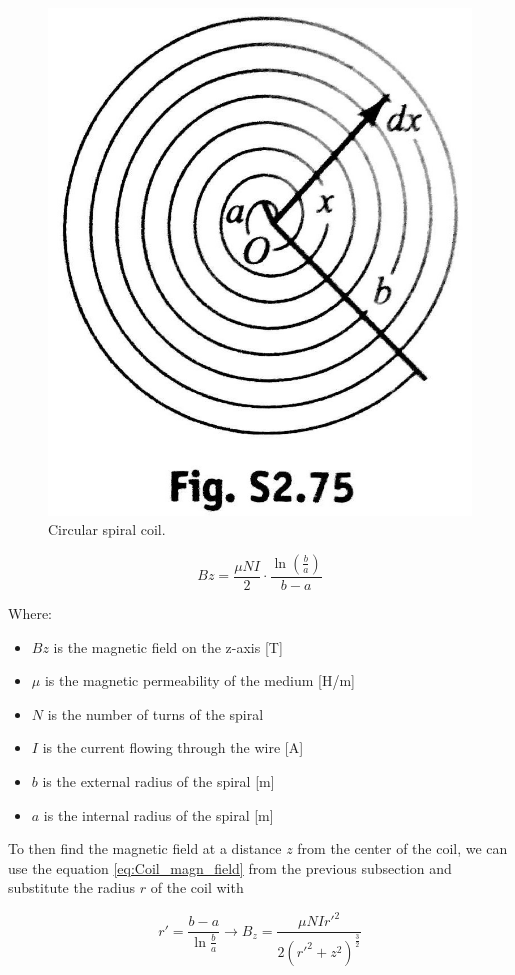\begin{figure}
    \centering
    \includegraphics[scale=0.4]{Chapters/Chapter2/PCB_coils/Figures/spiral_windings.jpg} %
    \caption[Coil spiral]{Circular spiral coil.}
    \label{fig:Coil_spiral}
\end{figure}

\begin{equation}
    Bz = \frac{\mu N I}{2} \cdot \frac{\ln(\frac{b}{a})}{b-a} %
    \label{eq:Spiral_magn_field_eq}
\end{equation}

Where:
\begin{itemize}
    \item $Bz$ is the magnetic field on the z-axis [T]
    \item $\mu$ is the magnetic permeability of the medium [H/m]
    \item $N$ is the number of turns of the spiral
    \item $I$ is the current flowing through the wire [A]
    \item $b$ is the external radius of the spiral [m]
    \item $a$ is the internal radius of the spiral [m]
\end{itemize}

To then find the magnetic field at a distance $z$ from the center of the coil, we can use the equation \ref{eq:Coil_magn_field} from the previous subsection and substitute the radius $r$ of the coil with   

\begin{equation}
    r' = \frac{b-a}{\ln\frac{b}{a}} \rightarrow B_z = \frac{\mu N I r'^2}{2(r'^2+z^2)^\frac{3}{2}} \label{eq:Spiral_magn_field_dist}
\end{equation}

